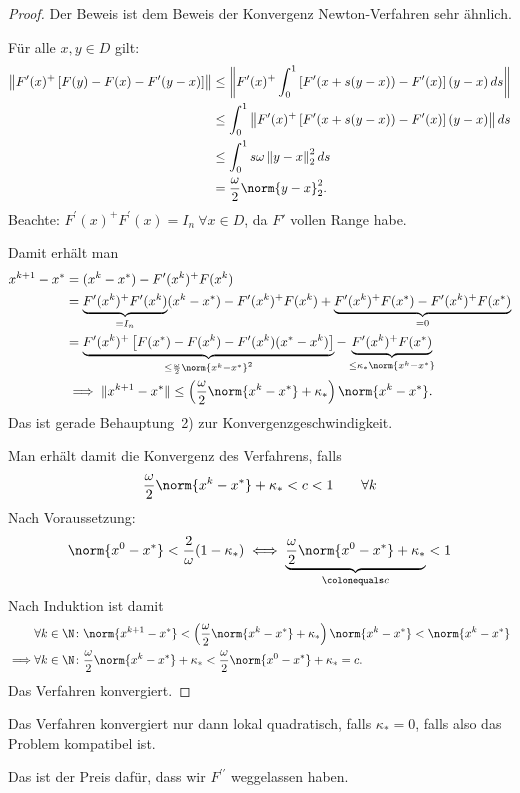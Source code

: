 \begin{proof} Der Beweis ist dem Beweis der Konvergenz Newton-Verfahren sehr ähnlich.

\medskip

Für alle $x,y \in D$ gilt:
\begin{align*}
 \left\Vert F'(x)^+ \left[F(y)-F(x)-F'(y-x) \right] \right\Vert
 & \leq
 \left\Vert F'(x)^+ \int_0^1 \left[F'(x+s(y-x))-F'(x) \right](y-x) \,ds \right\Vert \\
 & \leq
 \int_0^1 \left\Vert F'(x)^+ \left[F'(x+s(y-x))-F'(x) \right](y-x) \right\Vert ds \\
 & \leq
 \int_0^1 s \omega \left\Vert y-x \right\Vert_2^2 ds \\
 & =
 \frac{\omega}{2} \norm{y-x}_2^2.
\end{align*}
Beachte: $F^{\prime}(x)^+F^{\prime}(x)=I_n\ \forall x \in D$, da $F'$ vollen Range habe.

Damit erhält man
\begin{align*}
  x^{k+1}-x^* & =(x^k-x^* )-F'(x^k )^+F (x^k)  \\
  & = \underbrace{F'(x^k)^+F'(x^k)}_{=I_n} (x^k-x^* )-F'(x^k)^+ F(x^k )+\underbrace{F'(x^k)^+ F(x^*)-F'(x^k )^+F (x^* )}_{=0} \\
  & = \underbrace{F'(x^k)^+\left[ F (x^* )-F (x^k )-F'(x^k) (x^*-x^k) \right]}_{\leq \frac{\omega}{2}\norm{x^k-x^*}^2}
     -\underbrace{F'(x^k)^+F(x^*)}_{\leq \kappa_* \norm{x^k-x^*}} \\
  & \implies \lVert x^{k+1}-x^* \rVert \leq \left( \frac{\omega}{2} \norm{x^k-x^*} + \kappa_* \right) \norm{x^k-x^*}.
\end{align*}
Das ist gerade Behauptung~2) zur Konvergenzgeschwindigkeit.

Man erhält damit die Konvergenz des Verfahrens, falls
\begin{align*}
  \frac{\omega}{2} \norm{x^k-x^*} +\kappa_*<c<1 \qquad \forall k
\end{align*}
Nach Voraussetzung:
\begin{equation*}
 \norm{x^0-x^*} < \frac{2}{\omega}(1-\kappa_*)
 \iff
 \underbrace{\frac{\omega}{2} \norm{x^0-x^*} +\kappa_*}_{\colonequals c} <1
\end{equation*}
Nach Induktion ist damit
\begin{align*}
 & \forall k \in \N \colon \norm{x^{k+1}-x^*}
 < \left( \frac{\omega}{2} \norm{x^k-x^*} + \kappa_* \right) \norm{x^k-x^*}
 < \norm{x^k-x^*} \\
 \implies & \forall k \in \N \colon \frac{\omega}{2}\norm{x^k-x^*} + \kappa_*< \frac{\omega}{2} \norm{x^0 - x^*} + \kappa_* = c.
\end{align*}
Das Verfahren konvergiert.
\end{proof}
Das Verfahren konvergiert nur dann lokal quadratisch, falls $\kappa_*=0$, falls also das Problem kompatibel ist.

\medskip

Das ist der Preis dafür, dass wir $F^{\prime \prime}$ weggelassen haben.

